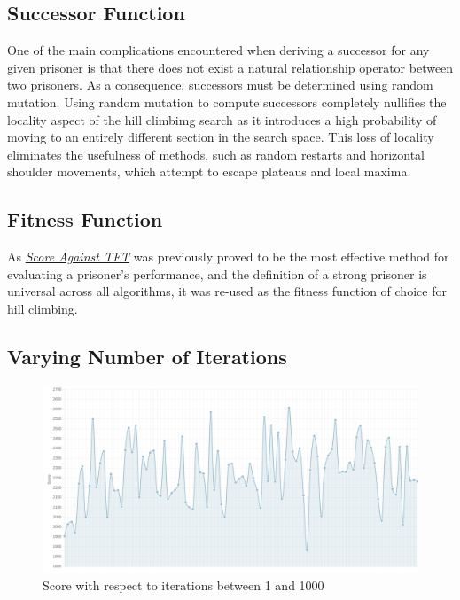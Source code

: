 \documentclass[12pt]{article}
\begin{document}
\subsection {Successor Function}

One of the main complications encountered when deriving a successor for any given prisoner
is that there does not exist a natural relationship operator between two prisoners.
As a consequence, successors must be determined using random mutation.  Using
random mutation to compute successors completely nullifies the locality aspect
of the hill climbimg search as it introduces a high probability of moving to an entirely different
section in the search space.  This loss of locality eliminates the usefulness of
methods, such as random restarts and horizontal shoulder movements, which attempt to
escape plateaus and local maxima.

\subsection {Fitness Function}

As \textit{\hyperref[tft]{Score Against TFT}} was previously proved to be the most
effective method for evaluating a prisoner's performance, and the definition
of a strong prisoner is universal across all algorithms, it was re-used as the fitness
function of choice for hill climbing.

\pagebreak

\subsection{Varying Number of Iterations}
\begin{figure}[h]
    \centering
    \includegraphics[scale=0.4]{figures/hill_climb.png}
    \caption{Score with respect to iterations between 1 and 1000}
\end{figure}
\end{document}
